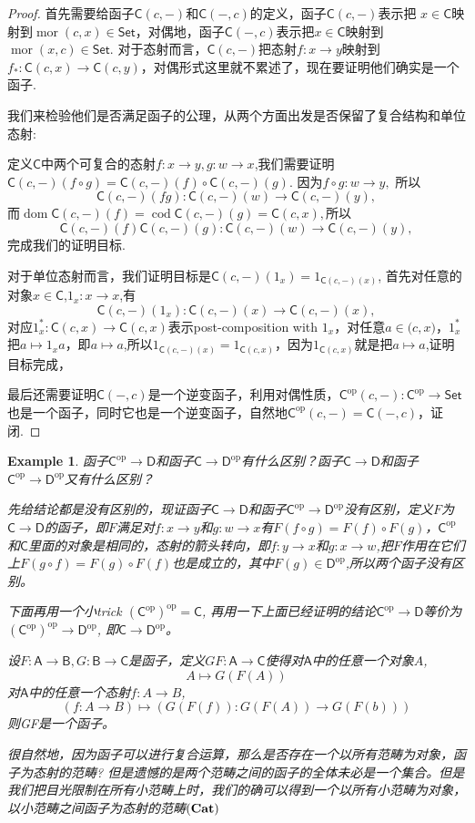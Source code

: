 \documentclass{article}
\newtheorem{example}[theorem]{Example}
\newcommand*{\cat}[1]{\textsf{#1}\xspace}
\newcommand{\Set}{\textsf{Set}\xspace}
\newcommand{\sC}{\mathsf{C}}
\newcommand{\sD}{\mathsf{D}}
\newcommand{\op}{\textrm{op}}
\newcommand*{\xfunc}[4]{{#2}\colon{#3}{#1}{#4}}
\newcommand*{\func}[3]{\xfunc{\to}{#1}{#2}{#3}}
\DeclareMathOperator{\mor}{mor}
\DeclareMathOperator{\dom}{dom}
\DeclareMathOperator{\cod}{cod}
\begin{document}
\begin{proof}
首先需要给函子$\cat{C}(c,-)$和$\cat{C}(-,c)$的定义，函子$\cat{C}(c,-)$表示把
$x \in \cat{C}$映射到$\mor(c,x) \in \cat{Set}$，对偶地，函子$\cat{C}(-,c)$表示把$x \in \cat{C}$映射到$\mor(x,c) \in \cat{Set}$. 对于态射而言，$\cat{C}(c,-)$把态射$\func{f}{x}{y}$映射到$\func{f_*}{\cat{C}(c,x)}{\cat{C}(c,y)}$，对偶形式这里就不累述了，现在要证明他们确实是一个函子. 

我们来检验他们是否满足函子的公理，从两个方面出发是否保留了复合结构和单位态射:

定义$\cat{C}$中两个可复合的态射$\func{f}{x}{y},\func{g}{w}{x}$,我们需要证明$\cat{C}(c,-)(f \circ g)=\cat{C}(c,-)(f) \circ \cat{C}(c,-)(g)$. 因为$\func{f \circ g}{w}{y},$ 所以\[\func{\cat{C}(c,-)(fg)}{\cat{C}(c,-)(w)}{\cat{C}(c,-)(y)},\]而$\dom\cat{C}(c,-)(f)=\cod\cat{C}(c,-)(g)=\cat{C}(c,x),$所以\[\func{\cat{C}(c,-)(f)\cat{C}(c,-)(g)}{\cat{C}(c,-)(w)}{\cat{C}(c,-)(y)},\]完成我们的证明目标.

对于单位态射而言，我们证明目标是$\cat{C}(c,-)(1_x)=1_{\cat{C}(c,-)(x)}$, 首先对任意的对象$x\in\cat{C}$,$\func{1_x}{x}{x}$,有\[\func{\cat{C}(c,-)(1_x)}{\cat{C}(c,-)(x)}{\cat{C}(c,-)(x)},\]对应$\func{1^{*}_{x}}{\cat{C}(c,x)}{\cat{C}(c,x)}$表示post-composition with $1_x$，对任意$a\in\cat(c,x)$，$1^{*}_{x}$把$a\mapsto 1_xa$，即$a \mapsto a$,所以$1_{\cat{C}(c,-)(x)} = 1_{\cat{C}(c,x)}$，因为$1_{\cat{C}(c,x)}$就是把$a \mapsto a$,证明目标完成，

最后还需要证明$\cat{C}(-,c)$是一个逆变函子，利用对偶性质，$\func{\cat{C}^\op(c,-)}{\cat{C}^\op}{\Set}$也是一个函子，同时它也是一个逆变函子，自然地$\cat{C}^\op(c,-) = \cat{C}(-,c)$，证闭. 
\end{proof}

\begin{example}
\rm 函子$\sC^{\op}\to \sD$和函子$\sC\to \sD^{\op}$有什么区别？函子$\sC\to\sD$和函子$\sC^{\op}\to \sD^{\op}$又有什么区别？

先给结论都是没有区别的，现证函子$\sC\to\sD$和函子$\sC^{\op}\to \sD^{\op}$没有区别，定义$F$为$\sC\to\sD$的函子，即$F$满足对$\func{f}{x}{y}$和$\func{g}{w}{x}$有$F(f \circ g)=F(f) \circ F(g)$，$\sC^{\op}$和$\sC$里面的对象是相同的，态射的箭头转向，即$\func{f}{y}{x}$和$\func{g}{x}{w}$,把$F$作用在它们上$F(g \circ f)=F(g) \circ F(f)$也是成立的，其中$F(g) \in \sD^{\op}$,所以两个函子没有区别。

下面再用一个小trick $({\sC^{\op}})^{\op}=\sC$, 再用一下上面已经证明的结论$\sC^{\op}\to\sD$等价为$({\sC^{\op}})^{\op}\to\sD^{\op}$, 即$\sC\to\sD^{\op}$。

设$F \colon \cat{A} \rightarrow \cat{B},G \colon \cat{B} \rightarrow \cat{C}$是函子，定义$GF \colon \cat{A} \rightarrow \cat{C}$使得对$\cat{A}$中的任意一个对象$A$,\[A \mapsto G(F(A))\]
对$\cat{A}$中的任意一个态射$f \colon A \rightarrow B$, \[(f \colon A \rightarrow B) \mapsto (G(F(f)) \colon G(F(A)) \rightarrow G(F(b))) \]则GF是一个函子。

很自然地，因为函子可以进行复合运算，那么是否存在一个以所有范畴为对象，函子为态射的范畴? 但是遗憾的是两个范畴之间的函子的全体未必是一个集合。但是我们把目光限制在所有小范畴上时，我们的确可以得到一个以所有小范畴为对象，以小范畴之间函子为态射的范畴$\bf(Cat)$

\end{example}
\end{document}
